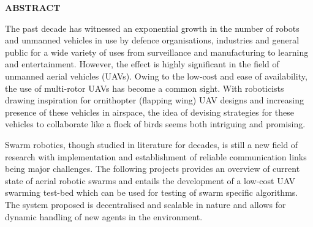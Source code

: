\begin{spacing}{2}
\begin{center}
\fontsize{24pt}{24pt}\selectfont \textbf{ABSTRACT\\}
\vspace*{1cm}
\end{center}
\fontsize{14pt}{14pt}\selectfont

The past decade has witnessed an exponential growth in the number of robots and unmanned vehicles in use by defence organisations, industries and general public for a wide variety of uses from surveillance and manufacturing to learning and entertainment. However, the effect is highly significant in the field of unmanned aerial vehicles (UAVs). Owing to the low-cost and ease of availability, the use of multi-rotor UAVs has become a common sight. With roboticists drawing inspiration for ornithopter (flapping wing) UAV designs and increasing presence of these vehicles in airspace, the idea of devising strategies for these vehicles to collaborate like a flock of birds seems both intriguing and promising.

Swarm robotics, though studied in literature for decades, is still a new field of research with implementation and establishment of reliable communication links being major challenges. The following projects provides an overview of current state of aerial robotic swarms and entails the development of a low-cost UAV swarming test-bed which can be used for testing of swarm specific algorithms. The system proposed is decentralised and scalable in nature and allows for dynamic handling of new agents in the environment.

\vspace{0.8cm}
\end{spacing}